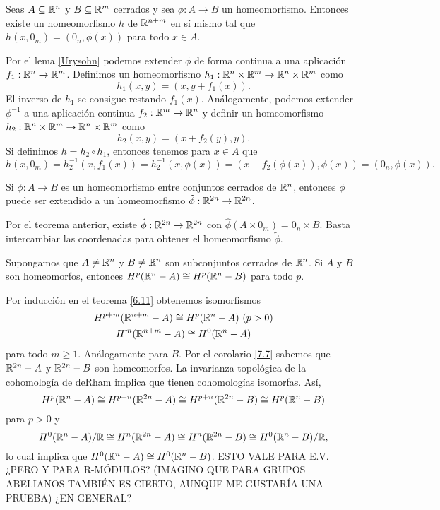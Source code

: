 \documentclass[CV.tex]{subfiles}
\begin{document}
\begin{prop}
Seas $A\subseteq\mathbb{R}^n$ y $B\subseteq\mathbb{R}^m$ cerrados y sea $\phi:A\to B$ un homeomorfismo. Entonces existe un homeomorfismo $h$ de $\mathbb{R}^{n+m}$ en sí mismo tal que $h(x,0_m)=(0_n,\phi(x))$ para todo $x\in A$. 
\end{prop}
\begin{dem}
Por el lema \ref{Urysohn} podemos extender $\phi$ de forma continua a una aplicación $f_1:\mathbb{R}^n\to\mathbb{R}^m$. Definimos un homeomorfismo $h_1:\mathbb{R}^n\times\mathbb{R}^m\to\mathbb{R}^n\times\mathbb{R}^m$ como
\[
h_1(x,y)=(x,y+f_1(x)).
\]
El inverso de $h_1$ se consigue restando $f_1(x)$. Análogamente, podemos extender $\phi^{-1}$ a una aplicación continua $f_2:\mathbb{R}^m\to\mathbb{R}^n$ y definir un homeomorfismo $h_2:\mathbb{R}^n\times\mathbb{R}^m\to\mathbb{R}^n\times\mathbb{R}^m$ como
\[
h_2(x,y)=(x+f_2(y),y).
\]
Si definimos $h=h_2\circ h_1$, entonces tenemos para $x\in A$ que
\[
h(x,0_m)=h_2^{-1}(x,f_1(x))=h_2^{-1}(x,\phi(x))=(x-f_2(\phi(x)),\phi(x))=(0_n,\phi(x)).
\]
\QED
\end{dem}

\begin{coro}\label{7.7}
Si $\phi:A\to B$ es un homeomorfismo entre conjuntos cerrados de $\mathbb{R}^n$, entonces $\phi$ puede ser extendido a un homeomorfismo $\tilde{\phi}:\mathbb{R}^{2n}\to \mathbb{R}^{2n}$.
\end{coro}
\begin{dem}
Por el teorema anterior, existe $\hat{\phi}:\mathbb{R}^{2n}\to\mathbb{R}^{2n}$ con $\hat{\phi}(A\times 0_m)=0_n\times B$. Basta intercambiar las coordenadas para obtener el homeomorfismo $\tilde{\phi}$. \QED
\end{dem}

\begin{teorema}
Supongamos que $A\neq\mathbb{R}^n$ y $B\neq\mathbb{R}^n$ son subconjuntos cerrados de $\mathbb{R}^n$. Si $A$ y $B$ son homeomorfos, entonces $H^p(\mathbb{R}^n-A)\cong H^p(\mathbb{R}^n-B)$ para todo $p$.
\end{teorema}
\begin{dem}
Por inducción en el teorema \ref{6.11} obtenemos isomorfismos 
\begin{gather*}
H^{p+m}(\mathbb{R}^{n+m}-A)\cong H^p(\mathbb{R}^n-A)\ (p>0)\\
H^m(\mathbb{R}^{n+m}-A)\cong H^0(\mathbb{R}^n-A)
\end{gather*}
para todo $m\geq 1$. Análogamente para $B$. Por el corolario \ref{7.7} sabemos que $\mathbb{R}^{2n}-A$ y $\mathbb{R}^{2n}-B$ son homeomorfos. La invarianza topológica de la cohomología de deRham implica que tienen cohomologías isomorfas. Así,
\[
H^p(\mathbb{R}^n-A)\cong H^{p+n}(\mathbb{R}^{2n}-A)\cong H^{p+n}(\mathbb{R}^{2n}-B)\cong H^p(\mathbb{R}^n-B)
\]
para $p>0$ y 
\[
H^0(\mathbb{R}^n-A)/\mathbb{R}\cong H^{n}(\mathbb{R}^{2n}-A)\cong H^{n}(\mathbb{R}^{2n}-B)\cong H^0(\mathbb{R}^n-B)/\mathbb{R},
\]
lo cual implica que $H^0(\mathbb{R}^n-A)\cong H^0(\mathbb{R}^n-B)$. ESTO VALE PARA E.V. ¿PERO Y PARA R-MÓDULOS? (IMAGINO QUE PARA GRUPOS ABELIANOS TAMBIÉN ES CIERTO, AUNQUE ME GUSTARÍA UNA PRUEBA) ¿EN GENERAL?
\QED
\end{dem}
\end{document}
